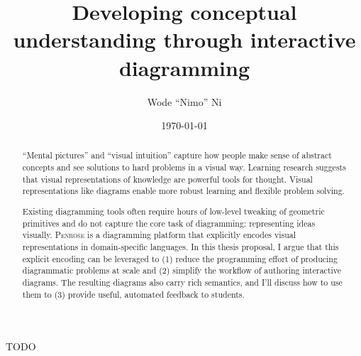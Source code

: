 \documentclass[12pt]{cmuthesis}
\newcommand*{\Penrose}{\textsc{Penrose}\xspace}
\begin{document}
 
\frontmatter

\pagestyle{empty}

\title{ 
{\bf Developing conceptual understanding through interactive diagramming}}

\author{Wode ``Nimo'' Ni}
\date{\today}





\maketitle

\begin{dedication}
TODO
\end{dedication}

\pagestyle{plain} %


\begin{abstract}
``Mental pictures'' and ``visual intuition'' capture how people make sense of abstract concepts and see solutions to hard problems in a visual way. Learning research suggests that visual representations of knowledge are powerful tools for thought. Visual representations like diagrams enable more robust learning and flexible problem solving. 

Existing diagramming tools often require hours of low-level tweaking of geometric primitives and do not capture the core task of diagramming: representing ideas visually. \Penrose is a diagramming platform that explicitly encodes visual representations in domain-specific languages. In this thesis proposal, I argue that this explicit encoding can be leveraged to (1) reduce the programming effort of producing diagrammatic problems at scale and (2) simplify the workflow of authoring interactive diagrams. The resulting diagrams also carry rich semantics, and I'll discuss how to use them to (3) provide useful, automated feedback to students. 


\end{abstract}
\end{document}
